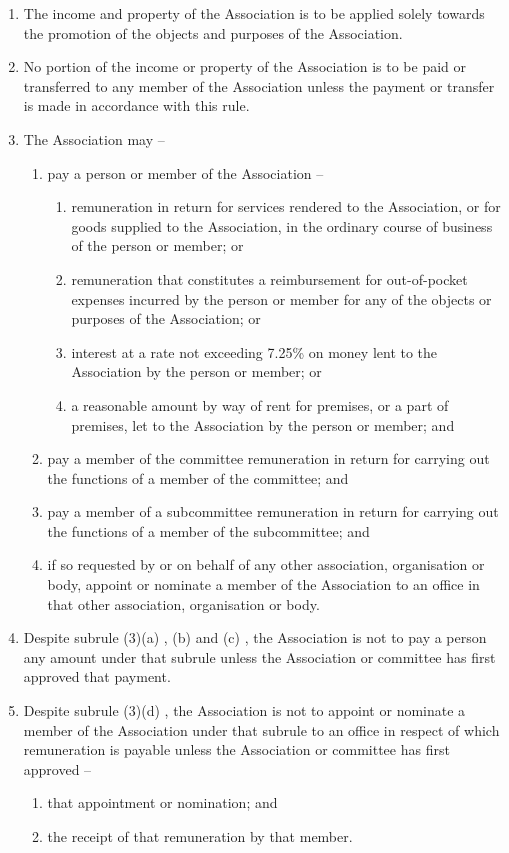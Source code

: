 \documentclass[a4paper,11pt]{article}
\begin{document}
\begin{enumerate}
	\item The income and property of the Association is to be applied solely towards the promotion of the objects and purposes of the Association.
	\item No portion of the income or property of the Association is to be paid or transferred to any member of the Association unless the payment or transfer is made in accordance with this rule.
	
	\item The Association may --
	\begin{enumerate}
		\item pay a person or member of the Association --
		\begin{enumerate}
			\item remuneration in return for services rendered to the Association, or for goods supplied to the Association, in the ordinary course of business of the person or member; or
			\item remuneration that constitutes a reimbursement for out-of-pocket expenses incurred by the person or member for any of the objects or purposes of the Association; or
			\item interest at a rate not exceeding 7.25\% on money lent to the Association by the person or member; or
			\item a reasonable amount by way of rent for premises, or a part of premises, let to the Association by the person or member; and
		\end{enumerate}
		
		\item pay a member of the committee remuneration in return for carrying out the functions of a member of the committee; and
		\item pay a member of a subcommittee remuneration in return for carrying out the functions of a member of the subcommittee; and
		\item if so requested by or on behalf of any other association, organisation or body, appoint or nominate a member of the Association to an office in that other association, organisation or body.
	\end{enumerate}
	
	\item Despite subrule (3)(a) , (b) and (c) , the Association is not to pay a person any amount under that subrule unless the Association or committee has first approved that payment.

	\item Despite subrule (3)(d) , the Association is not to appoint or nominate a member of the Association under that subrule to an office in respect of which remuneration is payable unless the Association or committee has first approved --
	\begin{enumerate}
		\item that appointment or nomination; and
		\item the receipt of that remuneration by that member.
	\end{enumerate}

\end{enumerate}
\end{document}
